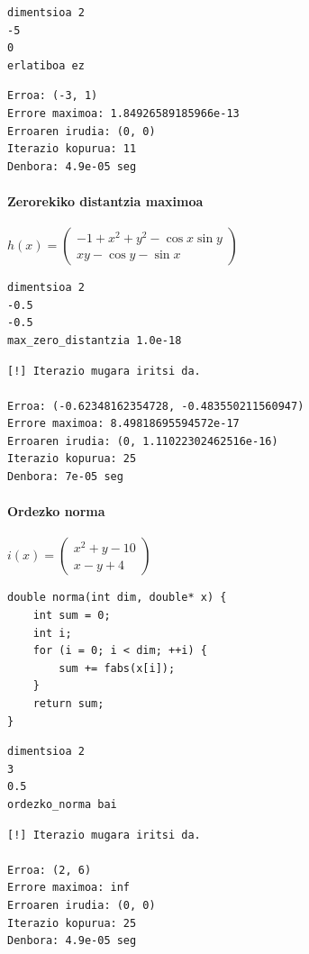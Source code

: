 \documentclass[10pt,a4paper,basque]{article}
\begin{document}
\begin{lstlisting}
dimentsioa 2
-5
0
erlatiboa ez
\end{lstlisting}

\begin{lstlisting}
Erroa: (-3, 1)
Errore maximoa: 1.84926589185966e-13
Erroaren irudia: (0, 0)
Iterazio kopurua: 11
Denbora: 4.9e-05 seg
\end{lstlisting}

\paragraph{Zerorekiko distantzia maximoa}

$h(x) = \left(
\begin{array}{c}
-1 + x^2 + y^2 - \cos{x}\sin{y}\\
xy - \cos{y} - \sin{x}
\end{array}
\right)$

\begin{lstlisting}
dimentsioa 2
-0.5
-0.5
max_zero_distantzia 1.0e-18
\end{lstlisting}

\begin{lstlisting}
[!] Iterazio mugara iritsi da.

Erroa: (-0.62348162354728, -0.483550211560947)
Errore maximoa: 8.49818695594572e-17
Erroaren irudia: (0, 1.11022302462516e-16)
Iterazio kopurua: 25
Denbora: 7e-05 seg
\end{lstlisting}

\paragraph{Ordezko norma}

$i(x) = \left(
\begin{array}{c}
x^2 + y - 10\\
x - y + 4
\end{array}
\right)$

\begin{lstlisting}
double norma(int dim, double* x) {
	int sum = 0;
	int i;
	for (i = 0; i < dim; ++i) {
		sum += fabs(x[i]);	
	}
	return sum;
}
\end{lstlisting}

\begin{lstlisting}
dimentsioa 2
3
0.5
ordezko_norma bai
\end{lstlisting}

\begin{lstlisting}
[!] Iterazio mugara iritsi da.

Erroa: (2, 6)
Errore maximoa: inf
Erroaren irudia: (0, 0)
Iterazio kopurua: 25
Denbora: 4.9e-05 seg
\end{lstlisting}
\end{document}
